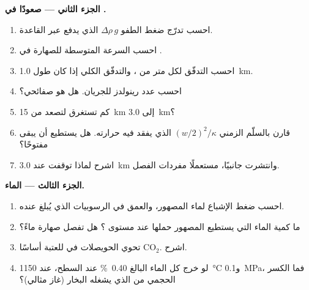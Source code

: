 \begin{problem}
\noindent\textbf{الجزء الثاني --- صعودًا في .}
\begin{enumerate}[resume]
\item احسب تدرّج ضغط الطفو $\Delta\rho\,g$ الذي يدفع 
عبر القاعدة.
\item احسب السرعة المتوسطة للصهارة في .
\item احسب التدفّق لكل متر من ، والتدفّق الكلي إذا كان طول 
\qty{1.0}{km}.
\item احسب عدد رينولدز للجريان. هل هو صفائحي؟
\item كم تستغرق  لتصعد من \qty{15}{km} إلى \qty{3.0}{km}؟
\item قارن بالسلّم الزمني $(w/2)^2/\kappa$ الذي يفقد فيه 
حرارته. هل يستطيع أن يبقى مفتوحًا؟
\item اشرح لماذا توقفت  عند \qty{3.0}{km} وانتشرت جانبيًا، مستعملًا
مفردات الفصل.
\end{enumerate}

\noindent\textbf{الجزء الثالث --- الماء.}
\begin{enumerate}[resume]
\item احسب ضغط الإشباع لماء المصهور، والعمق في
الرسوبيات الذي يُبلغ عنده.
\item ما كمية الماء التي يستطيع المصهور حملها عند مستوى ؟ هل تفصل صهارة
 ماءً؟
\item تحوي الحويصلات في  للعتبة أساسًا CO$_2$. اشرح.
\item لو خرج كل الماء البالغ \qty{0.40}{\percent} عند السطح، عند
\qty{1150}{\celsius} و\qty{0.1}{MPa}، فما الكسر الحجمي من  الذي
يشغله البخار (غاز مثالي)؟
\end{enumerate}


\end{problem}
